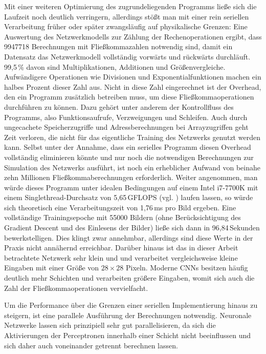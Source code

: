 \documentclass[../main.tex]{subfiles}
\begin{document}
Mit einer weiteren Optimierung des zugrundeliegenden Programms ließe sich die Laufzeit noch deutlich verringern, allerdings stößt man mit einer rein seriellen Verarbeitung früher oder später zwangsläufig auf physikalische Grenzen: 
Eine Auswertung des Netzwerkmodells zur Zählung der Rechenoperationen ergibt, dass 9947718 Berechnungen mit Fließkommazahlen notwendig sind, damit ein Datensatz das Netzwerkmodell vollständig vorwärts und rückwärts durchläuft. 99,5\,\% davon sind Multiplikationen, Additionen und Größenvergleiche. Aufwändigere Operationen wie Divisionen und Exponentialfunktionen machen ein halbes Prozent dieser Zahl aus. Nicht in diese Zahl eingerechnet ist der Overhead, den ein Programm zusätzlich betreiben muss, um diese Fließkommaoperationen durchführen zu können. Dazu gehört unter anderem der Kontrollfluss des Programms, also Funktionsaufrufe, Verzweigungen und Schleifen. Auch durch ungecachete Speicherzugriffe und Adressberechnungen bei Arrayzugriffen geht Zeit verloren, die nicht für das eigentliche Training des Netzwerks genutzt werden kann. Selbst unter der Annahme, dass ein serielles Programm diesen Overhead vollständig eliminieren könnte und nur noch die notwendigen Berechnungen zur Simulation des Netzwerks ausführt, ist noch ein erheblicher Aufwand von beinahe zehn Millionen Fließkommaberechnungen erforderlich. Weiter angenommen, man würde dieses Programm unter idealen Bedingungen auf einem Intel i7-7700K mit einem Singlethread-Durchsatz von 5,65\,GFLOPS (vgl. \cite{cpuSinglethreadBenchmark}) laufen lassen, so würde sich theoretisch eine Verarbeitungszeit von 1,76\,ms pro Bild ergeben. Eine vollständige Trainingsepoche mit 55000 Bildern (ohne Berücksichtigung des Gradient Descent und des Einlesens der Bilder) ließe sich dann in 96,84\,Sekunden bewerkstelligen. Dies klingt zwar annehmbar, allerdings sind diese Werte in der Praxis nicht annähernd erreichbar. Darüber hinaus ist das in dieser Arbeit betrachtete Netzwerk sehr klein und und verarbeitet vergleichsweise kleine Eingaben mit einer Größe von \(28\times{28}\) Pixeln. Moderne CNNs besitzen häufig deutlich mehr Schichten und verarbeiten größere Eingaben, womit sich auch die Zahl der Fließkommaoperationen vervielfacht. 

Um die Performance über die Grenzen einer seriellen Implementierung hinaus zu steigern, ist eine parallele Ausführung der Berechnungen notwendig. Neuronale Netzwerke lassen sich prinzipiell sehr gut parallelisieren, da sich die Aktivierungen der Perceptronen innerhalb einer Schicht nicht beeinflussen und sich daher auch voneinander getrennt berechnen lassen. 
\end{document}
